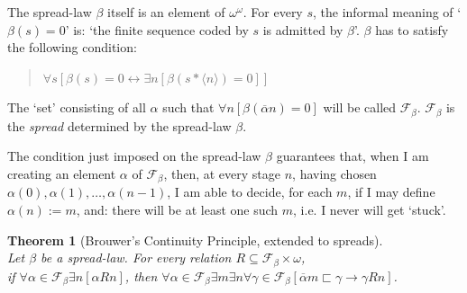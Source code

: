 \documentclass[a4paper]{amsart}
\theoremstyle{plain}
\newtheorem{theorem}{Theorem}
\begin{document}
The spread-law $\beta$ itself is an element of $\omega^\omega$. For every $s$, the informal meaning of `$\beta(s)=0$' is: `the finite sequence coded by $s$ is admitted by $\beta$'. $\beta$ has to satisfy the following condition:
\begin{quote} $\forall s[\beta(s)=0\leftrightarrow \exists n[\beta(s\ast\langle n \rangle)=0]]$ \end{quote}

The `set' consisting of all $\alpha$ such that $\forall n[\beta(\overline \alpha n)=0]$ will be called $\mathcal{F}_\beta$. $\mathcal{F}_\beta$ is  the {\it spread} determined by the spread-law $\beta$. 

The condition just imposed on the spread-law $\beta$ guarantees that, when I am creating an element $\alpha$ of $\mathcal{F}_\beta$, then, at every stage $n$, having chosen \\$\alpha(0), \alpha(1), \ldots, \alpha(n-1)$, I am able to decide, for each $m$, if I may define $\alpha(n):=m$,  and: there will be at least one such $m$, i.e. I never will get `stuck'. 
\begin{theorem}[Brouwer's Continuity Principle, extended to spreads]\label{T:bcpext}$\;$\\ Let $\beta$ be a spread-law.
For every relation $R\subseteq \mathcal{F}_\beta\times\omega$, \\if $\forall \alpha \in \mathcal{F}_\beta\exists n[\alpha Rn]$, then $\forall \alpha\in \mathcal{F}_\beta\exists m\exists n \forall \gamma\in \mathcal{F}_\beta[\overline\alpha m \sqsubset \gamma\rightarrow \gamma Rn]$. \end{theorem}
\end{document}
